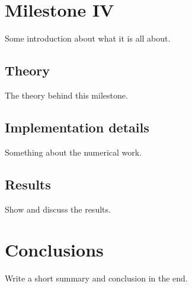 \documentclass{aa}
\begin{document}
\section{Milestone IV}
Some introduction about what it is all about.

\subsection{Theory}
The theory behind this milestone.

\subsection{Implementation details}
Something about the numerical work.

\subsection{Results}
Show and discuss the results.

\section{Conclusions}

Write a short summary and conclusion in the end. 


%


%
\end{document}
